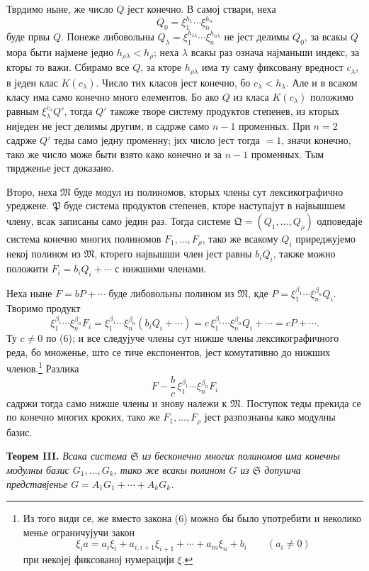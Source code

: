﻿\documentclass[11pt]{article}
\providecommand{\mM}{\mathfrak M}
\providecommand{\mS}{\mathfrak S}
\providecommand{\mP}{\mathfrak P}
\providecommand{\mQ}{\mathfrak Q}
\begin{document}
Тврдимо ныне, же число \(Q\) јест конечно. В самој ствари, неха
\[
 Q_0=\xi_1^{h_1}\cdots\xi_n^{h_n}
\]
буде првы \(Q\). Понеже либовольны \(Q_\lambda=\xi_1^{h_{1\lambda}}\cdots\xi_n^{h_{n\lambda}}\) не јест делимы \(Q_0\), за всакы \(Q\) мора быти најмене једно \(h_{\rho\lambda}<h_\rho\); неха \(\lambda\) всакы раз означа најманьши индекс, за кторы то важи. Сбирамо все \(Q\), за кторе \(h_{\rho\lambda}\) има ту саму фиксовану вредност \(c_\lambda\), в једен клас \(K(c_\lambda)\). Число тих класов јест конечно, бо \(c_\lambda<h_\lambda\). Але и в всаком класу има само конечно много елементов. Бо ако \(Q\) из класа \(K(c_\lambda)\) положимо равным \(\xi_\lambda^{c_\lambda}Q'\), тогда \(Q'\) такоже творе систему продуктов степенев, из кторых ниједен не јест делимы другим, и садрже само \(n-1\) променных. При \(n=2\) садрже \(Q'\) теды само једну променну; јих число јест тогда \(=1\), значи конечно, тако же число може быти взято како конечно и за \(n-1\) променных. Тым тврдженье јест доказано.

Второ, неха \(\mM\) буде модул из полиномов, кторых члены сут лексикографично уреджене. \(\mP\) буде система продуктов степенев, кторе наступајут в највышшем члену, всак записаны само једин раз. Тогда системе \(\mQ=(Q_1,\ldots,Q_\rho)\) одповедаје система конечно многих полиномов \(F_1,\ldots,F_\rho\), тако же всакому \(Q_i\) приреджујемо некој полином из \(\mM\), кторего највышши член јест равны \(b_iQ_i\), также можно положити \(F_i=b_iQ_i+\cdots\) с нижшими членами.

Неха ныне \(F=bP+\cdots\) буде либовольны полином из \(\mM\), кде \(P=\xi_1^{\beta_1}\cdots\xi_n^{\beta_n}Q_i\). Творимо продукт
\[
 \xi_1^{\beta_1}\cdots\xi_n^{\beta_n}F_i
 =\xi_1^{\beta_1}\cdots\xi_n^{\beta_n}(b_iQ_i+\cdots)
 =c\,\xi_1^{\beta_1}\cdots\xi_n^{\beta_n}Q_i+\cdots
 =cP+\cdots.
\]
Ту \(c\ne0\) по (6); и все следујуче члены сут нижше члены лексикографичного реда, бо множенье, што се тиче експонентов, јест комутативно до нижших членов.\footnote{Из того види се, же вместо закона (6) можно бы было употребити и неколико менье ограничујучи закон
\[
 \xi_i a=a_i\xi_i+a_{i,i+1}\xi_{i+1}+\cdots+a_{in}\xi_n+b_i\qquad(a_i\ne0)
\]
при некојеј фиксованој нумерацији \(\xi\).} Разлика
\[
 F-\frac bc\,\xi_1^{\beta_1}\cdots\xi_n^{\beta_n}F_i
\]
садржи тогда само нижше члены и знову належи к \(\mM\). Поступок теды прекида се по конечно многих кроких, тако же \(F_1,\ldots,F_\rho\) јест разпознаны како модулны базис.

\textbf{Теорем III.} \textit{Всака система \(\mS\) из бесконечно многих полиномов има конечны модулны базис \(G_1,\ldots,G_k\), тако же всакы полином \(G\) из \(\mS\) допушча представјенье \(G=A_1G_1+\cdots+A_kG_k\).}
\end{document}
